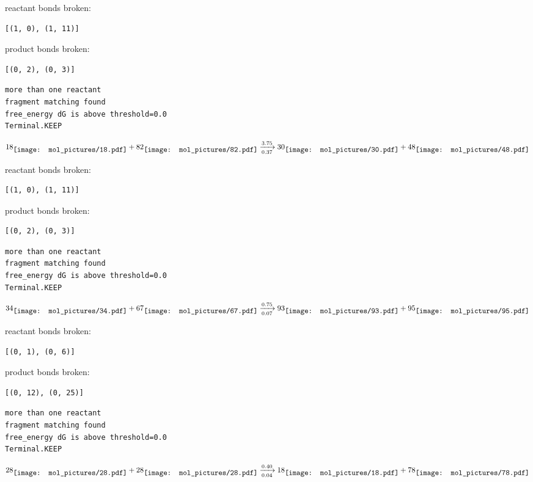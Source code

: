 \documentclass{article}
\begin{document}
reactant bonds broken:\begin{verbatim}
[(1, 0), (1, 11)]
\end{verbatim}
product bonds broken:\begin{verbatim}
[(0, 2), (0, 3)]
\end{verbatim}




\vspace{1cm}
\begin{verbatim}
more than one reactant
fragment matching found
free_energy dG is above threshold=0.0
Terminal.KEEP
\end{verbatim}
$$
18
\raisebox{-.5\height}{\texttt{[image: mol\_pictures/18.pdf]}}
+
82
\raisebox{-.5\height}{\texttt{[image: mol\_pictures/82.pdf]}}
\xrightarrow[0.37]{3.75}
30
\raisebox{-.5\height}{\texttt{[image: mol\_pictures/30.pdf]}}
+
48
\raisebox{-.5\height}{\texttt{[image: mol\_pictures/48.pdf]}}
$$


reactant bonds broken:\begin{verbatim}
[(1, 0), (1, 11)]
\end{verbatim}
product bonds broken:\begin{verbatim}
[(0, 2), (0, 3)]
\end{verbatim}




\vspace{1cm}
\begin{verbatim}
more than one reactant
fragment matching found
free_energy dG is above threshold=0.0
Terminal.KEEP
\end{verbatim}
$$
34
\raisebox{-.5\height}{\texttt{[image: mol\_pictures/34.pdf]}}
+
67
\raisebox{-.5\height}{\texttt{[image: mol\_pictures/67.pdf]}}
\xrightarrow[0.07]{0.75}
93
\raisebox{-.5\height}{\texttt{[image: mol\_pictures/93.pdf]}}
+
95
\raisebox{-.5\height}{\texttt{[image: mol\_pictures/95.pdf]}}
$$


reactant bonds broken:\begin{verbatim}
[(0, 1), (0, 6)]
\end{verbatim}
product bonds broken:\begin{verbatim}
[(0, 12), (0, 25)]
\end{verbatim}




\vspace{1cm}
\begin{verbatim}
more than one reactant
fragment matching found
free_energy dG is above threshold=0.0
Terminal.KEEP
\end{verbatim}
$$
28
\raisebox{-.5\height}{\texttt{[image: mol\_pictures/28.pdf]}}
+
28
\raisebox{-.5\height}{\texttt{[image: mol\_pictures/28.pdf]}}
\xrightarrow[0.04]{0.40}
18
\raisebox{-.5\height}{\texttt{[image: mol\_pictures/18.pdf]}}
+
78
\raisebox{-.5\height}{\texttt{[image: mol\_pictures/78.pdf]}}
$$
\end{document}
